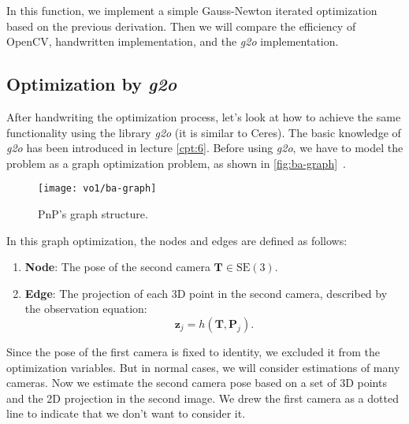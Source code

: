 In this function, we implement a simple Gauss-Newton iterated optimization based on the previous derivation. Then we will compare the efficiency of OpenCV, handwritten implementation, and the \textit{g2o} implementation.

\subsection{Optimization by \textit{g2o}}
After handwriting the optimization process, let's look at how to achieve the same functionality using the library \textit{g2o} (it is similar to Ceres). The basic knowledge of \textit{g2o} has been introduced in lecture \ref{cpt:6}. Before using \textit{g2o}, we have to model the problem as a graph optimization problem, as shown in \autoref{fig:ba-graph}~.

\begin{figure}[!htp]
	\centering
	\texttt{[image: vo1/ba-graph]}
	\caption{PnP's graph structure.}
	\label{fig:ba-graph}
\end{figure}

In this graph optimization, the nodes and edges are defined as follows:
\begin{enumerate}
	\item \textbf{Node}: The pose of the second camera $\mathbf{T} \in \mathrm{SE}(3)$.
	\item \textbf{Edge}: The projection of each 3D point in the second camera, described by the observation equation:
	\[
	\mathbf{z}_j = h(\mathbf{T}, \mathbf{P}_{j}).
	\]
\end{enumerate}

Since the pose of the first camera is fixed to identity, we excluded it from the optimization variables. But in normal cases, we will consider estimations of many cameras. Now we estimate the second camera pose based on a set of 3D points and the 2D projection in the second image. We drew the first camera as a dotted line to indicate that we don't want to consider it.

